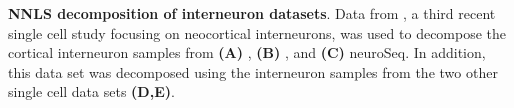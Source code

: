 \textbf{NNLS decomposition of interneuron datasets}. Data from \citep{Paul_2017}, a third recent single cell study focusing on neocortical interneurons, was used to decompose the cortical interneuron samples from \textbf{(A)} \citep{Tasic_2018}, \textbf{(B)} \citep{Zeisel_2018}, and \textbf{(C)}  neuroSeq. In addition, this data set was decomposed using the interneuron samples from the two other single cell data sets \textbf{(D,E)}.